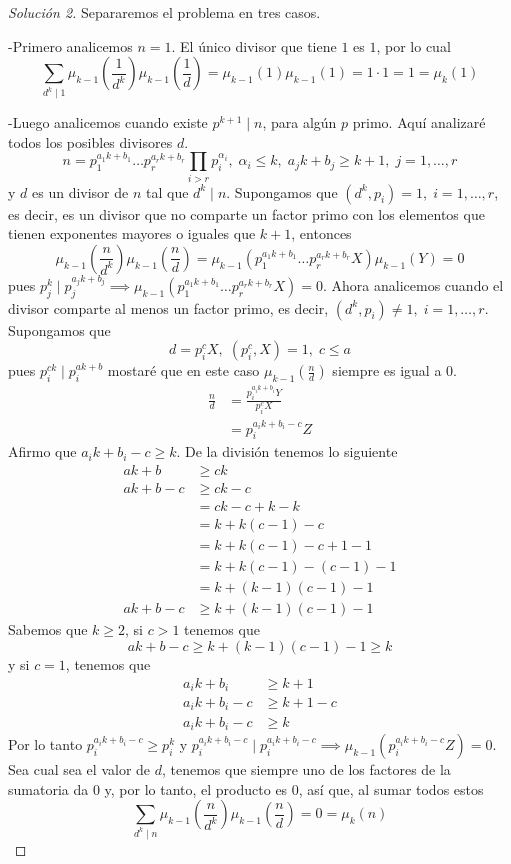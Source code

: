 \documentclass{article}
\theoremstyle{definition}
\theoremstyle{remark}
\begin{document}
\begin{proof}[Soluci\'on 2]
Separaremos el problema en tres casos.

-Primero analicemos $n = 1$. El \'unico divisor que tiene $1$ es $1$, por lo cual
$$\sum_{d^k \mid 1} \mu_{k - 1}\left(\frac{1}{d^k}\right)\mu_{k - 1}\left(\frac{1}{d}\right) = \mu_{k - 1}(1)\mu_{k - 1}(1) = 1 \cdot 1 = 1 = \mu_k(1)$$

-Luego analicemos cuando existe $p^{k + 1} \mid n$, para alg\'un $p$ primo. Aqu\'i analizar\'e todos los posibles divisores $d$.
$$n = p_1^{a_1 k + b_1} \dots p_r^{a_r k + b_r}\prod_{i > r} p_i^{\alpha_i},\;\alpha_i \leq k,\; a_j k + b_j \geq k + 1,\;j = 1,\dots,r$$
y $d$ es un divisor de $n$ tal que $d^k \mid n$. Supongamos que $(d^k, p_i) = 1,\;i = 1, \dots, r$, es decir, es un divisor que no comparte un factor primo con los elementos que tienen exponentes mayores o iguales que $k + 1$, entonces
$$\mu_{k-1}\left(\frac{n}{d^k}\right)\mu_{k - 1}\left(\frac{n}{d}\right) = \mu_{k - 1}(p_1^{a_1 k + b_1} \dots p_r^{a_r k + b_r}X)\mu_{k-1}(Y) = 0$$
pues $p_j^k \mid p_j^{a_j k + b_j} \implies \mu_{k - 1}(p_1^{a_1 k + b_1} \dots p_r^{a_r k + b_r}X) = 0$. Ahora analicemos cuando el divisor comparte al menos un factor primo, es decir, $(d^k, p_i) \not= 1,\; i = 1,\dots, r$. Supongamos que
$$d = p_i^cX,\;(p_i^c, X) = 1,\; c \leq a$$
pues $p_i^{ck} \mid p_i^{ak + b}$ mostar\'e que en este caso $\mu_{k-1}\left(\frac{n}{d}\right)$ siempre es igual a $0$.
\begin{align*}
    \frac{n}{d} &= \frac{p_i^{a_i k + b_i}Y}{p_i^cX}\\
    &= p_i^{a_i k + b_i - c} Z
\end{align*}
Afirmo que $a_i k + b_i - c \geq k$. De la divisi\'on tenemos lo siguiente
\begin{align*}
    ak + b &\geq ck\\
    ak + b - c &\geq ck - c\\
    &= ck - c + k - k\\
    &= k + k(c - 1) - c\\
    &= k + k(c - 1) - c + 1 - 1\\
    &= k + k(c - 1) -(c - 1) - 1\\
    &= k + (k - 1)(c - 1) - 1\\
    ak + b - c &\geq k + (k - 1)(c - 1) - 1
\end{align*}
Sabemos que $k \geq 2$, si $c > 1$ tenemos que
$$ak + b - c \geq k + (k - 1)(c - 1) - 1 \geq k$$
y si $c = 1$, tenemos que
\begin{align*}
    a_i k + b_i &\geq k + 1\\
    a_i k + b_i - c &\geq k + 1 - c\\
    a_i k + b_i - c &\geq k
\end{align*}
Por lo tanto $p_i^{a_i k + b_i - c} \geq p_i^k$ y $p_i^{a_i k + b_i - c} \mid p_i^{a_i k + b_i - c} \implies \mu_{k - 1}(p_i^{a_i k + b_i - c}Z) = 0$. Sea cual sea el valor de $d$, tenemos que siempre uno de los factores de la sumatoria da $0$ y, por lo tanto, el producto es $0$, as\'i que, al sumar todos estos
$$\sum_{d^k \mid n}\mu_{k-1}\left(\frac{n}{d^k}\right)\mu_{k - 1}\left(\frac{n}{d}\right) = 0 = \mu_k(n)$$


\end{proof}
\end{document}
